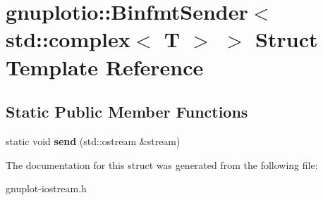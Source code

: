 \hypertarget{structgnuplotio_1_1BinfmtSender_3_01std_1_1complex_3_01T_01_4_01_4}{}\section{gnuplotio\+:\+:Binfmt\+Sender$<$ std\+:\+:complex$<$ T $>$ $>$ Struct Template Reference}
\label{structgnuplotio_1_1BinfmtSender_3_01std_1_1complex_3_01T_01_4_01_4}
\subsection*{Static Public Member Functions}
\begin{DoxyCompactItemize}
\item 
\mbox{\label{structgnuplotio_1_1BinfmtSender_3_01std_1_1complex_3_01T_01_4_01_4_a64633d068c93ef2822ee3aa6ef39d623}} 
static void {\bfseries send} (std\+::ostream \&stream)
\end{DoxyCompactItemize}


The documentation for this struct was generated from the following file\+:\begin{DoxyCompactItemize}
\item 
gnuplot-\/iostream.\+h\end{DoxyCompactItemize}
